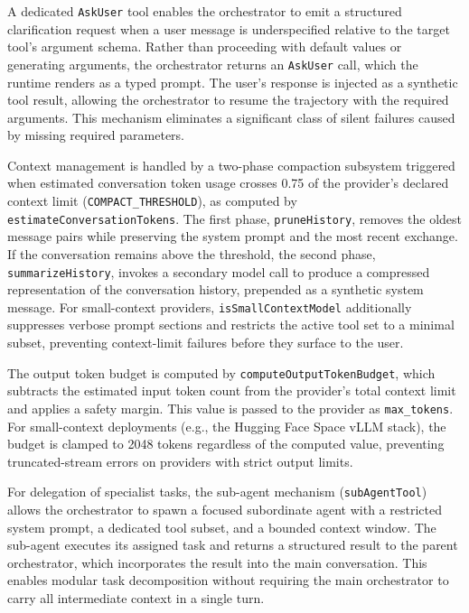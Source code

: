 \documentclass[conference]{IEEEtran}
\begin{document}
A dedicated \texttt{AskUser} tool enables the orchestrator to emit a structured clarification request when a user message is underspecified relative to the target tool’s argument schema. Rather than proceeding with default values or generating arguments, the orchestrator returns an \texttt{AskUser} call, which the runtime renders as a typed prompt. The user’s response is injected as a synthetic tool result, allowing the orchestrator to resume the trajectory with the required arguments. This mechanism eliminates a significant class of silent failures caused by missing required parameters.

Context management is handled by a two-phase compaction subsystem triggered when estimated conversation token usage crosses 0.75 of the provider’s declared context limit (\texttt{COMPACT\_THRESHOLD}), as computed by \texttt{estimateConversationTokens}. The first phase, \texttt{pruneHistory}, removes the oldest message pairs while preserving the system prompt and the most recent exchange. If the conversation remains above the threshold, the second phase, \texttt{summarizeHistory}, invokes a secondary model call to produce a compressed representation of the conversation history, prepended as a synthetic system message. For small-context providers, \texttt{isSmallContextModel} additionally suppresses verbose prompt sections and restricts the active tool set to a minimal subset, preventing context-limit failures before they surface to the user.

The output token budget is computed by \texttt{computeOutputTokenBudget}, which subtracts the estimated input token count from the provider’s total context limit and applies a safety margin. This value is passed to the provider as \texttt{max\_tokens}. For small-context deployments (e.g., the Hugging Face Space vLLM stack), the budget is clamped to 2048 tokens regardless of the computed value, preventing truncated-stream errors on providers with strict output limits.

For delegation of specialist tasks, the sub-agent mechanism (\texttt{subAgentTool}) allows the orchestrator to spawn a focused subordinate agent with a restricted system prompt, a dedicated tool subset, and a bounded context window. The sub-agent executes its assigned task and returns a structured result to the parent orchestrator, which incorporates the result into the main conversation. This enables modular task decomposition without requiring the main orchestrator to carry all intermediate context in a single turn.
\end{document}
